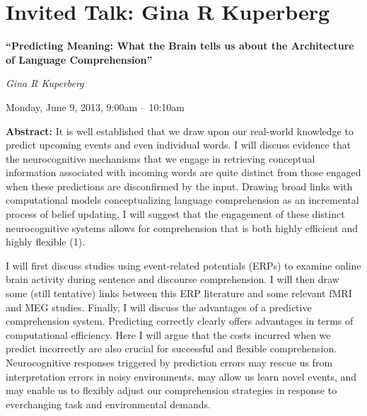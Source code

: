 \section{Invited Talk: Gina R Kuperberg}
\begin{center}

\begin{Large}
{\bfseries\Large ``Predicting Meaning: What the Brain tells us about the Architecture of Language Comprehension''}\vspace{1em}\par
\end{Large}

{\itshape Gina R Kuperberg}\vspace{1em}\par
Monday, June 9, 2013, 9:00am -- 10:10am \vspace{1em}\\
\PlenaryLoc
\end{center}

\noindent
{\bfseries Abstract:} It is well established that we draw upon our real-world knowledge to predict
upcoming events and even individual words. I will discuss evidence that the neurocognitive
mechanisms that we engage in retrieving conceptual information associated with incoming words are
quite distinct from those engaged when these predictions are disconfirmed by the input. Drawing
broad links with computational models conceptualizing language comprehension as an incremental
process of belief updating, I will suggest that the engagement of these distinct neurocognitive
systems allows for comprehension that is both highly efficient and highly flexible (1).

I will first discuss studies using event-related potentials (ERPs) to examine online brain activity
during sentence and discourse comprehension. I will then draw some (still tentative) links between
this ERP literature and some relevant fMRI and MEG studies. Finally, I will discuss the advantages
of a predictive comprehension system. Predicting correctly clearly offers advantages in terms of
computational efficiency. Here I will argue that the costs incurred when we predict incorrectly are
also crucial for successful and flexible comprehension. Neurocognitive responses triggered by
prediction errors may rescue us from interpretation errors in noisy environments, may allow us learn
novel events, and may enable us to flexibly adjust our comprehension strategies in response to
everchanging task and environmental demands.


